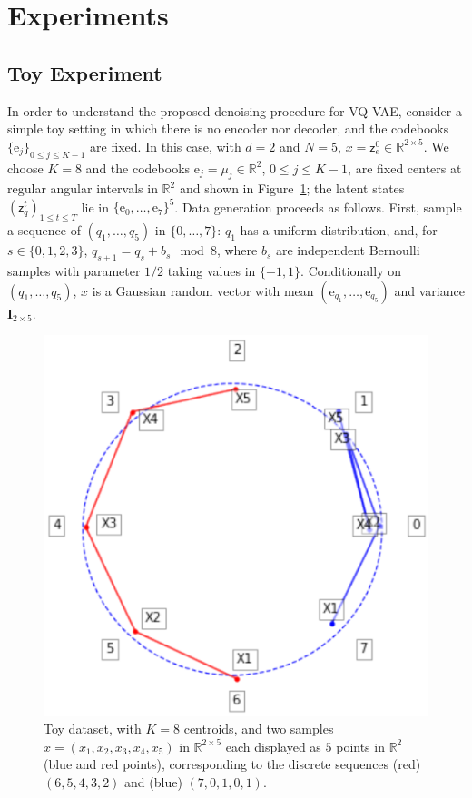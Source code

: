 \documentclass{article}
\theoremstyle{plain}
\theoremstyle{definition}
\theoremstyle{remark}
\newcommand{\rset}{\mathbb{R}}
\newcommand{\latentcont}{\mathsf{z}_e}
\newcommand{\latentdis}{\mathsf{z}_q}
\newcommand{\rme}{\mathrm{e}}
\newcommand{\embed}{\rme}
\begin{document}
\section{Experiments}

\subsection{Toy Experiment}
In order to understand the proposed denoising procedure for VQ-VAE, consider a simple toy setting in which there is no encoder nor decoder, and the codebooks $\{\embed_j\}_{0\leqslant j \leqslant K-1}$ are fixed. In this case, with $d=2$ and $N=5$, $x = \latentcont^0 \in \rset^{2\times 5}$. We choose $K=8$ and the codebooks $\embed_j = \mu_j \in \rset^2$, $0\leqslant j \leqslant K-1$, are fixed centers at regular angular intervals in $\rset^2$ and shown in Figure~\ref{fig:toydata}; the latent states $(\latentdis^t)_{1\leq t\leq T}$ lie in $\{\embed_0,\ldots,\embed_7\}^5$. Data generation proceeds as follows. First, sample a sequence of $(q_1,\ldots,q_5)$ in $\{0,\dots,7\}$: $q_1$ has a uniform distribution, and, for $s\in\{0,1,2,3\}$, $q_{s+1} = q_s + b_s \mod 8$, where $b_s$ are independent Bernoulli samples with parameter $1/2$ taking values in $\{-1, 1\}$. Conditionally on $(q_1,\ldots,q_5)$, $x$ is a Gaussian random vector with mean $(\embed_{q_1},\ldots,\embed_{q_5})$ and variance $\mathbf{I}_{2\times 5}$.


\begin{figure}[h!]
    \centering
    \includegraphics[scale=0.55]{./centroids2.pdf}
    \caption{Toy dataset, with $K=8$ centroids, and two samples $x = (x_1,x_2,x_3,x_4,x_5)$ in $\rset^{2 \times 5}$ each displayed as $5$ points in $\rset^{2}$ (blue and red points), corresponding to the discrete sequences (red) $(6,5,4,3,2)$ and (blue) $(7,0,1,0,1)$.}
    \label{fig:toydata}
\end{figure}
\end{document}
